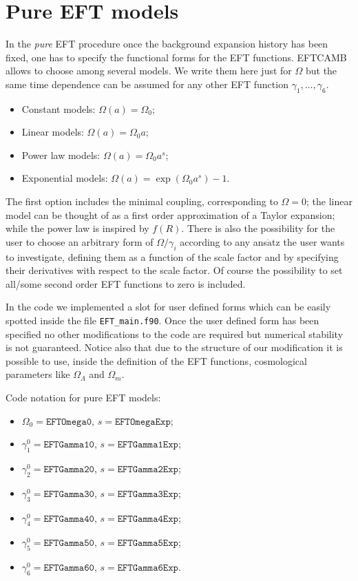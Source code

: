 \documentclass[prd,nofootinbib,showpacs]{revtex4}
\begin{document}
{\section{Pure EFT models}\label{Sec:PureEFTmodels}
%
In the \textit{pure} EFT procedure once the background expansion history has been fixed, one has to specify the functional forms for the EFT functions.  EFTCAMB allows to choose among several models. We write them here just for $\Omega$ but the same time dependence can be assumed for any other EFT function $\gamma_1,\dots,\gamma_6$.
%
\begin{itemize}
\item[] Constant models: $\Omega(a)=\Omega_0$; 
\item[] Linear models: $\Omega(a)=\Omega_0 a$;
\item[] Power law models: $\Omega(a)=\Omega_0 a^s$;
\item[] Exponential models: $\Omega(a)=  \exp{\left(\Omega_0 a^s\right)}-1$.
\end{itemize}
%

The first option includes the minimal coupling, corresponding to $\Omega=0$; the linear model  can be thought of as a first order approximation of a Taylor expansion; while the power law is inspired by $f(R)$. There is also the possibility for the user to choose an arbitrary form of $\Omega/\gamma_i$  according to any ans$\ddot{\text{a}}$tz the user wants to investigate, defining them as a function of the scale factor and by specifying their derivatives with respect to the scale factor.  Of course the possibility to set all/some second order EFT functions to zero is included.

In the code we implemented a slot for user defined forms which can be easily spotted inside the file \verb|EFT_main.f90|.
Once the user defined form has been specified no other modifications to the code are required but numerical stability is not guaranteed.
Notice also that due to the structure of our modification it is possible to use, inside the definition of the EFT functions, cosmological parameters like $\Omega_\Lambda$ and $\Omega_m$. 

Code notation for pure EFT models:
%
\begin{itemize}
\item $\Omega_0 = \texttt{EFTOmega0}$, $s = \texttt{EFTOmegaExp}$;
\item $\gamma_1^0 = \texttt{EFTGamma10}$, $s = \texttt{EFTGamma1Exp}$;
\item $\gamma_2^0 = \texttt{EFTGamma20}$, $s = \texttt{EFTGamma2Exp}$;
\item $\gamma_3^0 = \texttt{EFTGamma30}$, $s = \texttt{EFTGamma3Exp}$;
\item $\gamma_4^0 = \texttt{EFTGamma40}$, $s = \texttt{EFTGamma4Exp}$;
\item $\gamma_5^0 = \texttt{EFTGamma50}$, $s = \texttt{EFTGamma5Exp}$;
\item $\gamma_6^0 = \texttt{EFTGamma60}$, $s = \texttt{EFTGamma6Exp}$.
\end{itemize}


}
\end{document}
